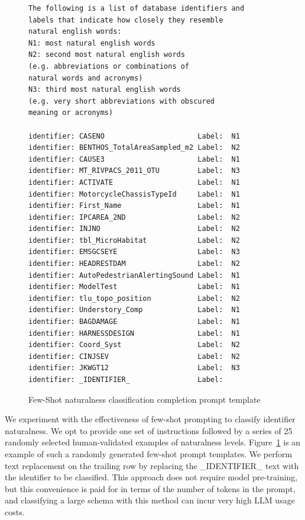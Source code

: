 \begin{figure}
  \begin{Verbatim}[frame=single,fillcolor=\color{lightgray}]
The following is a list of database identifiers and 
labels that indicate how closely they resemble 
natural english words:
N1: most natural english words
N2: second most natural english words 
(e.g. abbreviations or combinations of 
natural words and acronyms)
N3: third most natural english words 
(e.g. very short abbreviations with obscured 
meaning or acronyms)

identifier:	CASENO                      Label:	N1
identifier:	BENTHOS_TotalAreaSampled_m2 Label:	N2
identifier:	CAUSE3                      Label:	N1
identifier:	MT_RIVPACS_2011_OTU         Label:	N3
identifier:	ACTIVATE                    Label:	N1
identifier:	MotorcycleChassisTypeId     Label:	N1
identifier:	First_Name                  Label:	N1
identifier:	IPCAREA_2ND                 Label:	N2
identifier:	INJNO                       Label:	N2
identifier:	tbl_MicroHabitat            Label:	N2
identifier:	EMSGCSEYE                   Label:	N3
identifier:	HEADRESTDAM                 Label:	N2
identifier:	AutoPedestrianAlertingSound Label:	N1
identifier:	ModelTest                   Label:	N1
identifier:	tlu_topo_position           Label:	N2
identifier:	Understory_Comp             Label:	N1
identifier:	BAGDAMAGE                   Label:	N1
identifier:	HARNESSDESIGN               Label:	N1
identifier:	Coord_Syst                  Label:	N2
identifier:	CINJSEV                     Label:	N2
identifier:	JKWGT12                     Label:	N3
identifier:	_IDENTIFIER_                Label:
  \end{Verbatim}
\caption{Few-Shot naturalness classification completion prompt template}
\label{fig:fewshotclassifierprompt}
\end{figure}

We experiment with the effectiveness of few-shot prompting to classify identifier naturalness.
We opt to provide one set of instructions followed by a series of 25 randomly selected human-validated examples of naturalness levels.
Figure~\ref{fig:fewshotclassifierprompt} is an example of such a randomly generated few-shot prompt templates.
We perform text replacement on the trailing row by replacing the \_IDENTIFIER\_ text with the identifier to be classified. 
This approach does not require model pre-training, but this convenience is paid for in terms of the number of tokens in the prompt, and classifying a large schema with this method can incur very high LLM usage costs.




